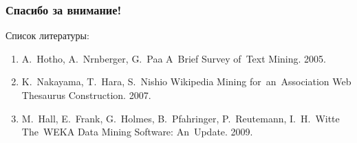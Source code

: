 \documentclass{beamer}
\begin{document}
\begin{frame}
\frametitle{Спасибо за внимание!}

Список литературы:

\begin{enumerate}

\item{
A.~Hotho,
A.~Nrnberger,
G.~Paa
A~Brief Survey of~Text Mining.
2005.
}

\item {
K.~Nakayama,
T.~Hara,
S.~Nishio
Wikipedia Mining for~an~Association Web Thesaurus Construction. 
2007.
}

\item{
M.~Hall,
E.~Frank,
G.~Holmes,
B.~Pfahringer,
P.~Reutemann,
I.~H.~Witte
The~WEKA Data Mining Software: An~Update.
2009.
}
\end{enumerate}
\end{frame}
\end{document}
